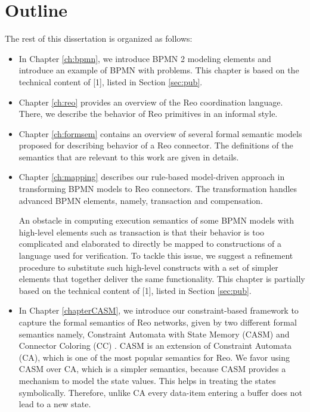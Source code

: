 \section{Outline}
The rest of this dissertation is organized as follows:

\begin{itemize}
\item In Chapter \ref{ch:bpmn}, we introduce BPMN 2 modeling elements and introduce an example of BPMN with problems. This chapter is based on the technical content of [1], listed in Section \ref{sec:pub}.
 

\item Chapter \ref{ch:reo} provides an overview of the Reo coordination language. There, we describe the behavior of Reo primitives in an informal style.

\item Chapter \ref{ch:formsem} contains an overview of several formal semantic models proposed for describing behavior of a Reo connector. The definitions of the semantics that are relevant to this work are given in details.

\item Chapter \ref{ch:mapping} describes our rule-based model-driven approach in transforming BPMN models to Reo connectors. %
The transformation handles advanced BPMN elements, namely, transaction and compensation. 

An obstacle in computing execution semantics of some BPMN models with high-level elements such as transaction is that their behavior is too complicated and elaborated to directly be mapped to constructions of a language used for verification. To tackle this issue, we suggest a refinement procedure to substitute such high-level constructs with a set of simpler elements that together deliver the same functionality. %
		This chapter is partially based on the technical content of [1], listed in Section \ref{sec:pub}.
 
\item In Chapter \ref{chapterCASM}, we introduce our constraint-based framework to capture the formal semantics of Reo networks, given by two different formal semantics namely, Constraint Automata with State Memory (CASM) and Connector Coloring (CC) \cite{coloring}. CASM is an extension of Constraint Automata (CA), which is one of the most popular semantics for Reo. We favor using CASM over CA, which is a simpler semantics, because CASM provides a mechanism to model the state values. This helps in treating the states symbolically. Therefore, unlike CA every data-item entering a buffer does not lead to a new state. %


\end{itemize}
